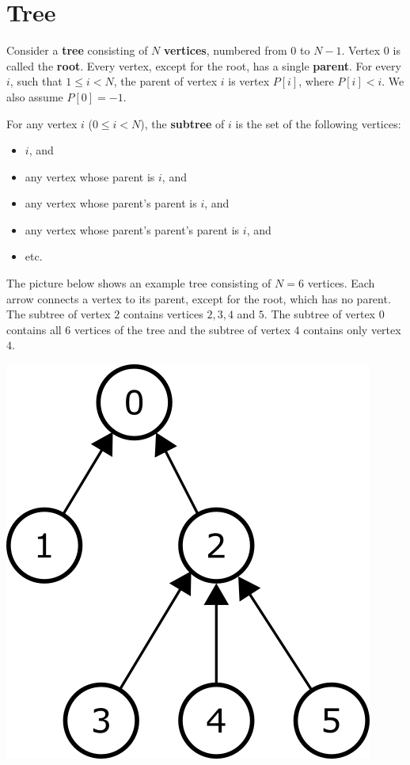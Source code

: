 \hypertarget{tree}{%
\section{Tree}\label{tree}}

Consider a \textbf{tree} consisting of \(N\) \textbf{vertices}, numbered
from \(0\) to \(N-1\). Vertex \(0\) is called the \textbf{root}. Every
vertex, except for the root, has a single \textbf{parent}. For every
\(i\), such that \(1 \leq i < N\), the parent of vertex \(i\) is vertex
\(P[i]\), where \(P[i] < i\). We also assume \(P[0] = -1\).

For any vertex \(i\) (\(0 \leq i < N\)), the \textbf{subtree} of \(i\)
is the set of the following vertices:

\begin{itemize}
\tightlist
\item
  \(i\), and
\item
  any vertex whose parent is \(i\), and
\item
  any vertex whose parent's parent is \(i\), and
\item
  any vertex whose parent's parent's parent is \(i\), and
\item
  etc.
\end{itemize}

The picture below shows an example tree consisting of \(N = 6\)
vertices. Each arrow connects a vertex to its parent, except for the
root, which has no parent. The subtree of vertex \(2\) contains vertices
\(2, 3, 4\) and \(5\). The subtree of vertex \(0\) contains all \(6\)
vertices of the tree and the subtree of vertex \(4\) contains only
vertex \(4\).

\includegraphics{subtrees.png}

